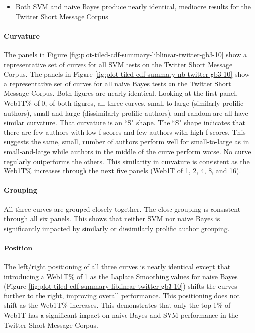 	\begin{itemize}
	\item Both SVM and naive Bayes produce nearly identical, mediocre results for the Twitter Short Message Corpus
	\end{itemize}
	
		\paragraph*{Curvature}  The panels in Figure \ref{fig:plot-tiled-cdf-summary-liblinear-twitter-gb3-10} show a representative set of curves for all SVM tests on the Twitter Short Message Corpus.  The panels in Figure \ref{fig:plot-tiled-cdf-summary-nb-twitter-gb3-10} show a representative set of curves for all naive Bayes tests on the Twitter Short Message Corpus. Both figures are nearly identical.  Looking at the first panel, Web1T\% of 0, of both figures, all three curves, small-to-large (similarly prolific authors), small-and-large (dissimilarly prolific authors), and random are all have similar curvature.  That curvature is an ``S" shape. The ``S" shape indicates that there are few authors with low f-scores and few authors with high f-scores. This suggests the same, small, number of authors perform well for small-to-large as in small-and-large while authors in the middle of the curve perform worse. No curve regularly outperforms the others. This similarity in curvature is consistent as the Web1T\% increases through the next five panels (Web1T of 1, 2, 4, 8, and 16). 
		\paragraph*{Grouping} All three curves are grouped closely together.  The close grouping is consistent through all six panels.  This shows that neither SVM nor naive Bayes is significantly impacted by similarly or dissimilarly prolific author grouping. 
		\paragraph*{Position} The left/right positioning of all three curves is nearly identical except that introducing a Web1T\% of 1 as the Laplace Smoothing values for naive Bayes (Figure \ref{fig:plot-tiled-cdf-summary-liblinear-twitter-gb3-10}) shifts the curves further to the right, improving overall performance.  This positioning does not shift as the Web1T\% increases.  This demonstrates that only the top 1\% of Web1T has a significant impact on naive Bayes and SVM performance in the Twitter Short Message Corpus.
